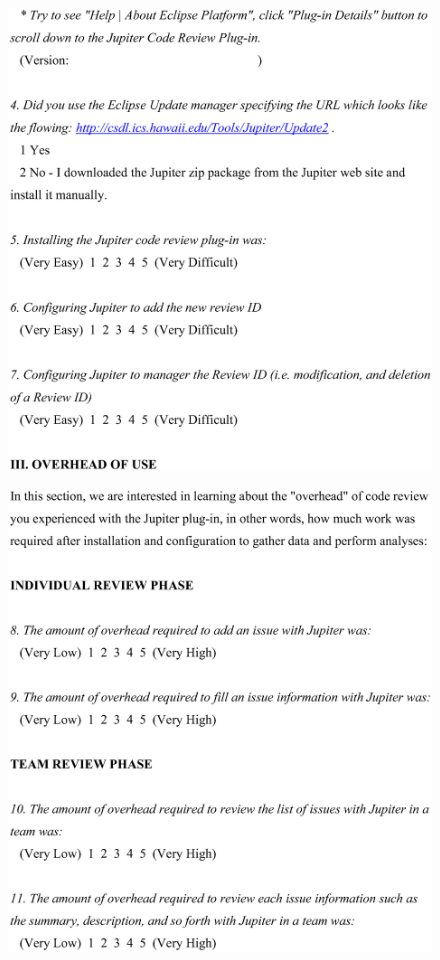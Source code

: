 \begin{figure}[htbp]
  \centering
  \includegraphics[width=1.0\textwidth]{figures/JupiterQuestionnaire_6.eps}
  \label{fig:JupiterQuestionnaire_6}
\end{figure}

\begin{figure}[htbp]
  \centering
  \includegraphics[width=1.0\textwidth]{figures/JupiterQuestionnaire_7.eps}
  \label{fig:JupiterQuestionnaire_7}
\end{figure}

